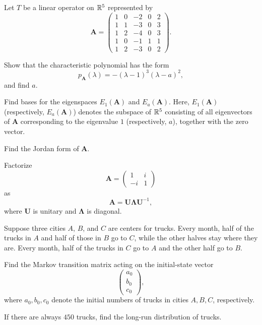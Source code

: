 \documentclass[11pt,oneside]{article}
\begin{document}
\begin{problem}
Let $T$ be a linear operator on $\mathbb{R}^5$ represented by
\[
\mathbf A=
\begin{pmatrix}
1&0&-2&0&2\\
1&1&-3&0&3\\
1&2&-4&0&3\\
1&0&-1&1&1\\
1&2&-3&0&2
\end{pmatrix}.
\]
\begin{problemsubparts}
\item Show that the characteristic polynomial has the form
\[
p_{\mathbf A}(\lambda)=-(\lambda-1)^3(\lambda-a)^2,
\]
and find $a$.
\item Find bases for the eigenspaces $E_1(\mathbf A)$ and $E_a(\mathbf A)$. Here, $E_1(\mathbf A)$ (respectively, $E_a(\mathbf A)$) denotes the subspace of $\mathbb{R}^5$ consisting of all eigenvectors of $\mathbf A$ corresponding to the eigenvalue $1$ (respectively, $a$), together with the zero vector.
\item Find the Jordan form of $\mathbf A$.
\end{problemsubparts}
\end{problem}

\begin{problem}
Factorize
\[
\mathbf A=
\begin{pmatrix}
1&i\\
-i&1
\end{pmatrix}
\]
as
\[
\mathbf A=\mathbf U\boldsymbol\Lambda\mathbf U^{-1},
\]
where $\mathbf U$ is unitary and $\boldsymbol\Lambda$ is diagonal.
\end{problem}

\begin{problem}
Suppose three cities $A$, $B$, and $C$ are centers for trucks. Every month, half of the trucks in $A$ and half of those in $B$ go to $C$, while the other halves stay where they are. Every month, half of the trucks in $C$ go to $A$ and the other half go to $B$.
\begin{problemsubparts}
\item Find the Markov transition matrix acting on the initial-state vector
\[
\begin{pmatrix}
a_0\\b_0\\c_0
\end{pmatrix},
\]
where $a_0,b_0,c_0$ denote the initial numbers of trucks in cities $A,B,C$, respectively.
\item If there are always $450$ trucks, find the long-run distribution of trucks.
\end{problemsubparts}
\end{problem}
\end{document}
